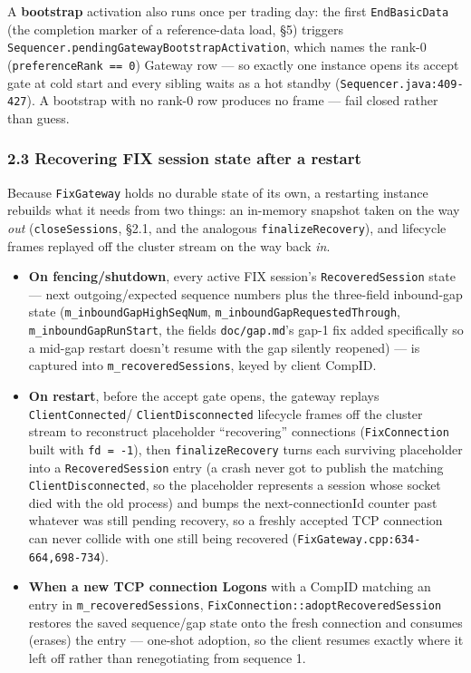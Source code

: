 \documentclass[
  10pt,
]{article}
\providecommand{\tightlist}{%
  \setlength{\itemsep}{0pt}\setlength{\parskip}{0pt}}
\begin{document}
A \textbf{bootstrap} activation also runs once per trading day: the
first \texttt{EndBasicData} (the completion marker of a reference-data
load, §5) triggers \texttt{Sequencer.pendingGatewayBootstrapActivation},
which names the rank-0 (\texttt{preferenceRank\ ==\ 0}) Gateway row ---
so exactly one instance opens its accept gate at cold start and every
sibling waits as a hot standby (\texttt{Sequencer.java:409-427}). A
bootstrap with no rank-0 row produces no frame --- fail closed rather
than guess.

\subsubsection{2.3 Recovering FIX session state after a
restart}\label{recovering-fix-session-state-after-a-restart}

Because \texttt{FixGateway} holds no durable state of its own, a
restarting instance rebuilds what it needs from two things: an in-memory
snapshot taken on the way \emph{out} (\texttt{closeSessions}, §2.1, and
the analogous \texttt{finalizeRecovery}), and lifecycle frames replayed
off the cluster stream on the way back \emph{in}.

\begin{itemize}
\tightlist
\item
  \textbf{On fencing/shutdown}, every active FIX session's
  \texttt{RecoveredSession} state --- next outgoing/expected sequence
  numbers plus the three-field inbound-gap state
  (\texttt{m\_inboundGapHighSeqNum},
  \texttt{m\_inboundGapRequestedThrough},
  \texttt{m\_inboundGapRunStart}, the fields \texttt{doc/gap.md}'s gap-1
  fix added specifically so a mid-gap restart doesn't resume with the
  gap silently reopened) --- is captured into
  \texttt{m\_recoveredSessions}, keyed by client CompID.
\item
  \textbf{On restart}, before the accept gate opens, the gateway replays
  \texttt{ClientConnected}/ \texttt{ClientDisconnected} lifecycle frames
  off the cluster stream to reconstruct placeholder ``recovering''
  connections (\texttt{FixConnection} built with \texttt{fd\ =\ -1}),
  then \texttt{finalizeRecovery} turns each surviving placeholder into a
  \texttt{RecoveredSession} entry (a crash never got to publish the
  matching \texttt{ClientDisconnected}, so the placeholder represents a
  session whose socket died with the old process) and bumps the
  next-connectionId counter past whatever was still pending recovery, so
  a freshly accepted TCP connection can never collide with one still
  being recovered (\texttt{FixGateway.cpp:634-664,698-734}).
\item
  \textbf{When a new TCP connection Logons} with a CompID matching an
  entry in \texttt{m\_recoveredSessions},
  \texttt{FixConnection::adoptRecoveredSession} restores the saved
  sequence/gap state onto the fresh connection and consumes (erases) the
  entry --- one-shot adoption, so the client resumes exactly where it
  left off rather than renegotiating from sequence 1.
\end{itemize}
\end{document}
